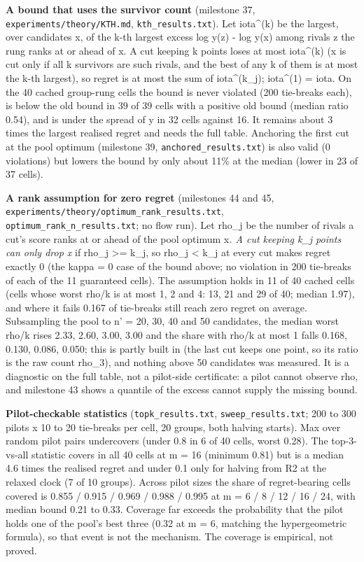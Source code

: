 \documentclass[conference]{IEEEtran}
\begin{document}
\textbf{A bound that uses the survivor count} (milestone 37,
\texttt{experiments/\allowbreak{}theory/\allowbreak{}KTH.md}, \texttt{kth\_\allowbreak{}results.txt}). Let
iota\^{}(k) be the largest, over candidates x, of the k-th largest
excess log y(z) - log y(x) among rivals z the rung ranks at or ahead of
x. A cut keeping k points loses at most iota\^{}(k) (x is cut only if
all k survivors are such rivals, and the best of any k of them is at
most the k-th largest), so regret is at most the sum of iota\^{}(k\_j);
iota\^{}(1) = iota. On the 40 cached group-rung cells the bound is never
violated (200 tie-breaks each), is below the old bound in 39 of 39 cells
with a positive old bound (median ratio 0.54), and is under the spread
of y in 32 cells against 16. It remains about 3 times the largest
realised regret and needs the full table. Anchoring the first cut at the
pool optimum (milestone 39, \texttt{anchored\_\allowbreak{}results.txt}) is also
valid (0 violations) but lowers the bound by only about 11\% at the
median (lower in 23 of 37 cells).

\textbf{A rank assumption for zero regret} (milestones 44 and 45,
\texttt{experiments/\allowbreak{}theory/\allowbreak{}optimum\_\allowbreak{}rank\_\allowbreak{}results.txt},
\texttt{optimum\_\allowbreak{}rank\_\allowbreak{}n\_\allowbreak{}results.txt}; no flow run). Let rho\_j be the
number of rivals a cut's score ranks at or ahead of the pool optimum
x\emph{. A cut keeping k\_j points can only drop x} if rho\_j
\textgreater= k\_j, so rho\_j \textless{} k\_j at every cut makes regret
exactly 0 (the kappa = 0 case of the bound above; no violation in 200
tie-breaks of each of the 11 guaranteed cells). The assumption holds in
11 of 40 cached cells (cells whose worst rho/k is at most 1, 2 and 4:
13, 21 and 29 of 40; median 1.97), and where it fails 0.167 of
tie-breaks still reach zero regret on average. Subsampling the pool to
n' = 20, 30, 40 and 50 candidates, the median worst rho/k rises 2.33,
2.60, 3.00, 3.00 and the share with rho/k at most 1 falls 0.168, 0.130,
0.086, 0.050; this is partly built in (the last cut keeps one point, so
its ratio is the raw count rho\_3), and nothing above 50 candidates was
measured. It is a diagnostic on the full table, not a pilot-side
certificate: a pilot cannot observe rho, and milestone 43 shows a
quantile of the excess cannot supply the missing bound.

\textbf{Pilot-checkable statistics} (\texttt{topk\_\allowbreak{}results.txt},
\texttt{sweep\_\allowbreak{}results.txt}; 200 to 300 pilots x 10 to 20 tie-breaks per
cell, 20 groups, both halving starts). Max over random pilot pairs
undercovers (under 0.8 in 6 of 40 cells, worst 0.28). The top-3-vs-all
statistic covers in all 40 cells at m = 16 (minimum 0.81) but is a
median 4.6 times the realised regret and under 0.1 only for halving from
R2 at the relaxed clock (7 of 10 groups). Across pilot sizes the share
of regret-bearing cells covered is 0.855 / 0.915 / 0.969 / 0.988 / 0.995
at m = 6 / 8 / 12 / 16 / 24, with median bound 0.21 to 0.33. Coverage
far exceeds the probability that the pilot holds one of the pool's best
three (0.32 at m = 6, matching the hypergeometric formula), so that
event is not the mechanism. The coverage is empirical, not proved.
\end{document}
